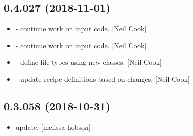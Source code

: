 \documentclass[a4paper,10pt,english]{report}
\begin{document}
\subsection{0.4.027 (2018-11-01)}
\label{\detokenize{misc/changelog:id274}}\begin{itemize}
\item {} 
 - continue work on input code. {[}Neil Cook{]}

\item {} 
 - continue work on input code. {[}Neil Cook{]}

\item {} 
 - define file types using new classes. {[}Neil Cook{]}

\item {} 
 - update recipe definitions based on changes. {[}Neil Cook{]}

\end{itemize}


\subsection{0.3.058 (2018-10-31)}
\label{\detokenize{misc/changelog:id275}}\begin{itemize}
\item {} 
 update. {[}melissa-hobson{]}

\end{itemize}
\end{document}
